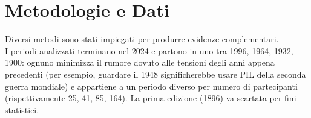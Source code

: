 \section{Metodologie e Dati}\label{sec:methods}



Diversi metodi sono stati impiegati per produrre evidenze complementari.\\
I periodi analizzati terminano nel 2024 e partono in uno tra 1996, 1964, 1932,
1900: ognuno minimizza il rumore dovuto alle tensioni degli anni appena
precedenti (per esempio, guardare il 1948 significherebbe usare PIL della
seconda guerra mondiale) e appartiene a un periodo diverso per numero di
partecipanti (rispettivamente 25, 41, 85, 164). La prima edizione (1896) va
scartata per fini statistici.\\



